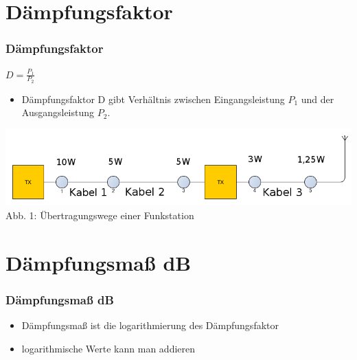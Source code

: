 

\subtitle{Technik Klasse E 10: \\
          Dezibel, D\"ampfung \& Kabel \\[2em]}
\date{Stand 01.12.2014}



\section*{D\"ampfungsfaktor}
\begin{frame}
\frametitle{D\"ampfungsfaktor}
\begin{center}
\begin{minipage}{0.3\textwidth}
	\huge{$ D = \frac{P_{1}}{P_{2}}$}
\end{minipage}
\begin{minipage}{0.6\textwidth}
\begin{itemize}
	\item  D\"ampfungsfaktor D gibt Verh\"altnis zwischen Eingangsleistung $P_{1}$ und der Ausgangsleistung $P_{2}$.
\end{itemize}	
\end{minipage}
\vspace{1cm}	
\includegraphics[scale=0.35]{e10/ubertragung.png}\\
Abb. 1: Übertragungswege einer Funkstation
\end{center}
\end{frame}



\section*{D\"ampfungsma{\ss} dB}
\begin{frame}
\frametitle{D\"ampfungsma{\ss} dB}
\begin{center}
	\begin{itemize}
		\item D\"ampfungsma{\ss} ist die logarithmierung des D\"ampfungsfaktor
		\item logarithmische Werte kann man addieren
	\end{itemize}
	\vspace{0.5cm}
\end{center}
\end{frame}

